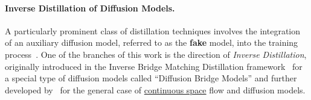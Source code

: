 \paragraph{Inverse Distillation of Diffusion Models.} 
  A particularly prominent class of distillation techniques involves the integration of an auxiliary diffusion model, referred to as the \textbf{fake} model, into the training process~\citep{yin2024one,yin2024improved,zhou2024score, zhou2024adversarial, huang2024flow, gushchin2025inverse, kornilov2025universal}. One of the branches of this work is the direction of 
  \textit{Inverse Distillation}, originally introduced in the Inverse Bridge Matching Distillation framework~\citep{gushchin2025inverse} for a special type of diffusion models called ``Diffusion Bridge Models'' and further developed by~\citet{kornilov2025universal} for the general case of \underline{continuous space} flow and diffusion models. 

